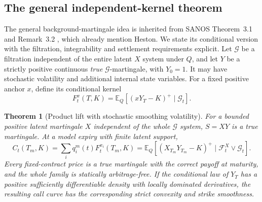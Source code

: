\documentclass[11pt,a4paper]{article}
\numberwithin{equation}{section}
\newtheorem{theorem}{Theorem}[section]
\theoremstyle{definition}\newtheorem{definition}[theorem]{Definition}
\theoremstyle{remark}\newtheorem{remark}[theorem]{Remark}
\newcommand{\E}{\mathbb E}\newcommand{\R}{\mathbb R}
\newcommand{\F}{\mathcal F}\newcommand{\G}{\mathcal G}
\begin{document}
\subsection{The general independent-kernel theorem}
The general background-martingale idea is inherited from SANOS Theorem~3.1 and Remark~3.2 \cite{SANOS}, which already mention Heston. We state its conditional version with the filtration, integrability and settlement requirements explicit. Let $\G$ be a filtration independent of the entire latent $X$ system under $Q$, and let $Y$ be a strictly positive continuous \emph{true} $\G$-martingale, with $Y_0=1$. It may have stochastic volatility and additional internal state variables. For a fixed positive anchor $x$, define its conditional kernel
\begin{equation}
 F_t^x(T,K)=\E_Q[(xY_T-K)^+\mid\G_t].
 \label{eq:general-kernel}
\end{equation}
\begin{theorem}[Product lift with stochastic smoothing volatility]
\label{thm:sv-product}
For a bounded positive latent martingale $X$ independent of the whole $\G$ system, $S=XY$ is a true martingale. At a model expiry with finite latent support,
\begin{equation}
 C_t(T_m,K)=\sum_iq_i^m(t)F_t^{x_i}(T_m,K)
          =\E_Q[(X_{T_m}Y_{T_m}-K)^+\mid\F_t^X\vee\G_t].
 \label{eq:sv-product}
\end{equation}
Every fixed-contract price is a true martingale with the correct payoff at maturity, and the whole family is statically arbitrage-free. If the conditional law of $Y_T$ has a positive sufficiently differentiable density with locally dominated derivatives, the resulting call curve has the corresponding strict convexity and strike smoothness.
\end{theorem}
\end{document}
